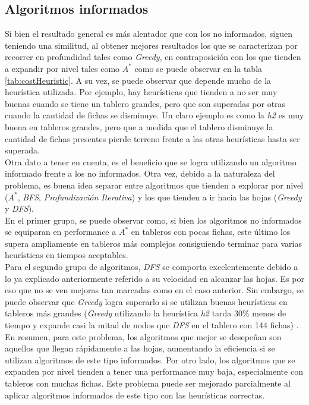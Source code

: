 \documentclass{sig-alternate}
\begin{document}
\subsection*{Algoritmos informados}
Si bien el resultado general es m\'as alentador que con los no informados, siguen teniendo una similitud, al obtener mejores resultados los que se caracterizan por recorrer en profundidad tales como \emph{Greedy}, en contraposici\'on con los que tienden a expandir por nivel tales como \emph{$A^*$} como se puede observar en la tabla \ref{tab:costHeuristic}. A su vez, se puede observar que depende mucho de la heur\'istica utilizada. Por ejemplo, hay heur\'isticas que tienden a no ser muy buenas cuando se tiene un tablero grandes, pero que son superadas por otras cuando la cantidad de fichas se disminuye. Un claro ejemplo es como la \emph{h2} es muy buena en tableros grandes, pero que a medida que el tablero disminuye la cantidad de fichas presentes pierde terreno frente a las otras heur\'isticas hasta ser superada.\\
Otra dato a tener en cuenta, es el beneficio que se logra utilizando un algoritmo informado frente a los no informados. Otra vez, debido a la naturaleza del problema, es buena idea separar entre algoritmos que tienden a explorar por nivel (\emph{$A^*$}, \emph{BFS}, \emph{Profundizaci\'on Iterativa}) y los que tienden a ir  hacia las hojas (\emph{Greedy} y \emph{DFS}).\\
En el primer grupo, se puede observar como, si bien los algoritmos no informados se equiparan en performance a \emph{$A^*$} en tableros con pocas fichas, este \'ultimo los supera ampliamente en tableros m\'as complejos consiguiendo terminar para varias heur\'isticas en tiempos aceptables.\\
Para el segundo grupo de algoritmos, \emph{DFS} se comporta excelentemente debido a lo ya explicado anteriormente referido a su velocidad en alcanzar las hojas. Es por eso que no se ven mejoras tan marcadas como en el caso anterior. Sin embargo, se puede observar que \emph{Greedy} logra superarlo si se utilizan buenas heur\'isticas en tableros m\'as grandes (\emph{Greedy} utilizando la heur\'istica \emph{h2} tarda $30\%$ menos de tiempo y expande casi la mitad de nodos que \emph{DFS} en el tablero con 144 fichas) .\\
En resumen, para este problema, los algoritmos que mejor se desepe\~nan son aquellos que llegan r\'apidamente a las hojas, aumentando la eficiencia si se utilizan algoritmos de este tipo informados. Por otro lado, los algoritmos que se expanden por nivel tienden a tener una performance muy baja, especialmente con tableros con muchas fichas. Este problema puede ser mejorado parcialmente al aplicar algoritmos informados de este tipo con las heur\'isticas correctas.\\
\end{document}
